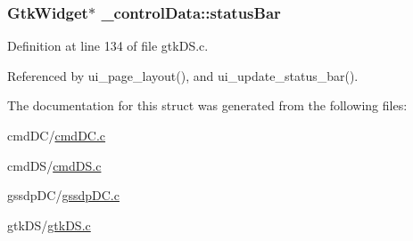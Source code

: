 \subsubsection[{\texorpdfstring{status\+Bar}{statusBar}}]{\setlength{\rightskip}{0pt plus 5cm}Gtk\+Widget$\ast$ \+\_\+control\+Data\+::status\+Bar}\hypertarget{struct__control_data_a661ed960369e640e5f56da1abe7c2168}{}\label{struct__control_data_a661ed960369e640e5f56da1abe7c2168}


Definition at line 134 of file gtk\+D\+S.\+c.



Referenced by ui\+\_\+page\+\_\+layout(), and ui\+\_\+update\+\_\+status\+\_\+bar().



The documentation for this struct was generated from the following files\+:\begin{DoxyCompactItemize}
\item 
cmd\+D\+C/\hyperlink{cmd_d_c_8c}{cmd\+D\+C.\+c}\item 
cmd\+D\+S/\hyperlink{cmd_d_s_8c}{cmd\+D\+S.\+c}\item 
gssdp\+D\+C/\hyperlink{gssdp_d_c_8c}{gssdp\+D\+C.\+c}\item 
gtk\+D\+S/\hyperlink{gtk_d_s_8c}{gtk\+D\+S.\+c}\end{DoxyCompactItemize}
